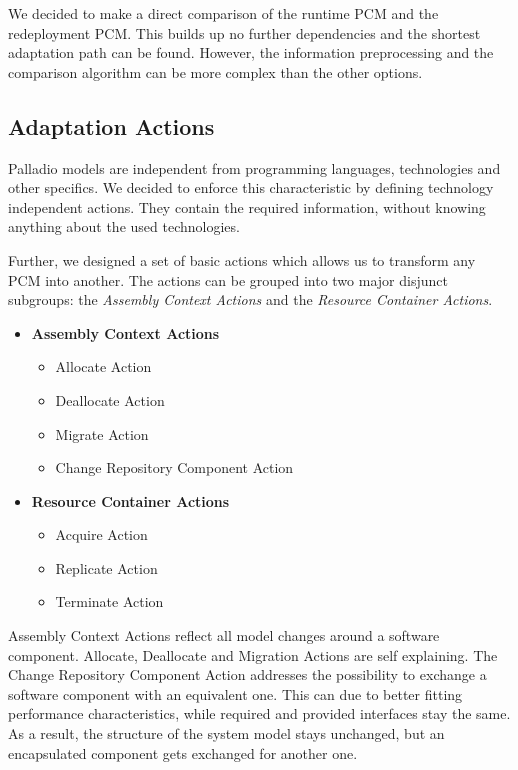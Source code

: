 We decided to make a direct comparison of the runtime PCM and the redeployment PCM. This builds up no further dependencies and the shortest adaptation path can be found. However, the information preprocessing and the comparison algorithm can be more complex than the other options.

\subsection{Adaptation Actions}
Palladio models are independent from programming languages, technologies and other specifics. We decided to enforce this characteristic by defining technology independent actions. They contain the required information, without knowing anything about the used technologies.

Further, we designed a set of basic actions which allows us to transform any PCM into another. The actions can be grouped into two major disjunct subgroups: the \textit{Assembly Context Actions} and the \textit{Resource Container Actions}.

\begin{itemize}
	\label{enum:SysAdap:plan:actions}
	\setlength\itemsep{0em}
	\item \textbf{Assembly Context Actions}
	\begin{itemize}
		\setlength\itemsep{0em}
		\item Allocate Action
		\item Deallocate Action
		\item Migrate Action
		\item Change Repository Component Action
	\end{itemize}
	\item \textbf{Resource Container Actions}
	\begin{itemize}
		\setlength\itemsep{0em}
		\item Acquire Action
		\item Replicate Action
		\item Terminate Action
	\end{itemize}
\end{itemize}

Assembly Context Actions reflect all model changes around a software component. Allocate, Deallocate and Migration Actions are self explaining. The Change Repository Component Action addresses the possibility to exchange a software component with an equivalent one. This can due to better fitting performance characteristics, while required and provided interfaces stay the same. As a result, the structure of the system model stays unchanged, but an encapsulated component gets exchanged for another one.

